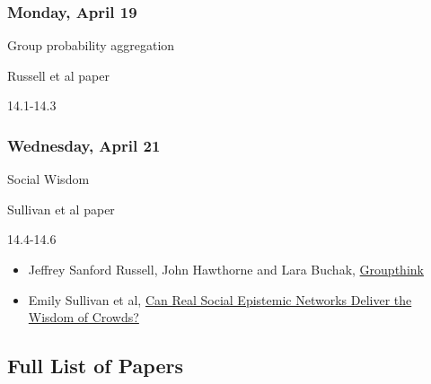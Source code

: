 \documentclass[
]{article}
\providecommand{\tightlist}{%
  \setlength{\itemsep}{0pt}\setlength{\parskip}{0pt}}
\begin{document}
\begin{multicols}{2}

\hypertarget{monday-april-19}{%
\subsubsection{Monday, April 19}\label{monday-april-19}}

\begin{description}
\tightlist
\item[Topic]
Group probability aggregation
\item[Reading]
Russell et al paper
\item[Lectures]
14.1-14.3
\end{description}

\hypertarget{wednesday-april-21}{%
\subsubsection{Wednesday, April 21}\label{wednesday-april-21}}

\begin{description}
\tightlist
\item[Topic]
Social Wisdom
\item[Reading]
Sullivan et al paper
\item[Lectures]
14.4-14.6
\end{description}

\end{multicols}

\begin{itemize}
\tightlist
\item
  Jeffrey Sanford Russell, John Hawthorne and Lara Buchak,
  \href{https://philpapers.org/rec/RUSG}{Groupthink}
\item
  Emily Sullivan et al,
  \href{https://philarchive.org/archive/SULCRS}{Can Real Social
  Epistemic Networks Deliver the Wisdom of Crowds?}
\end{itemize}

\newpage

\hypertarget{full-list-of-papers}{%
\subsection{Full List of Papers}\label{full-list-of-papers}}
\end{document}
